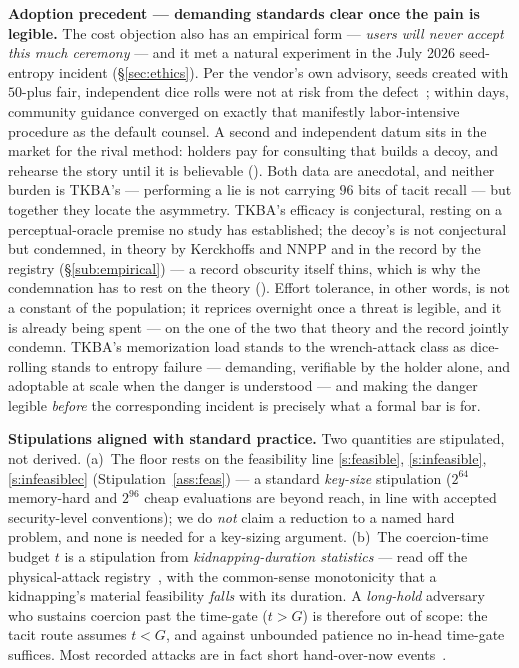 \textbf{Adoption precedent --- demanding standards clear once the pain is
legible.} The cost objection also has an empirical form --- \emph{users will
never accept this much ceremony} --- and it met a natural experiment in the
July 2026 seed-entropy incident (\S\ref{sec:ethics}). Per the vendor's own
advisory, seeds created with $50$-plus fair, independent dice rolls were not
at risk from the defect~\cite{coinkite-entropy};
within days, community guidance converged on exactly that manifestly
labor-intensive procedure as the default counsel. A second and independent datum
sits in the market for the rival method: holders pay for consulting that builds a
decoy, and rehearse the story until it is believable
(\cite[\S3]{denial-spiral}). Both data are anecdotal, and neither burden is
TKBA's --- performing a lie is not carrying $96$ bits of tacit recall --- but
together they locate the asymmetry. TKBA's efficacy is conjectural, resting on a
perceptual-oracle premise no study has established; the decoy's is not
conjectural but condemned, in theory by Kerckhoffs and NNPP and in the record by
the registry (\S\ref{sub:empirical}) --- a record obscurity itself thins, which is
why the condemnation has to rest on the theory (\cite[\S6]{denial-spiral}).
Effort tolerance, in other words, is not a
constant of the population; it reprices overnight once a threat is legible, and
it is already being spent --- on the one of the two that theory and the record
jointly condemn. TKBA's memorization load stands to the wrench-attack class
as dice-rolling stands to entropy failure --- demanding, verifiable by the
holder alone, and adoptable at scale when the danger is understood --- and
making the danger legible \emph{before} the corresponding incident is
precisely what a formal bar is for.

\textbf{Stipulations aligned with standard practice.} Two quantities are
stipulated, not derived. (a)~The floor rests on the feasibility line
\ref{s:feasible}, \ref{s:infeasible}, \ref{s:infeasiblec} (Stipulation~\ref{ass:feas}) 
--- a standard \emph{key-size} stipulation ($2^{64}$ memory-hard and $2^{96}$ cheap
evaluations are beyond reach, in line with accepted security-level conventions); we do \emph{not} claim a reduction 
to a named hard problem, and none is needed for a key-sizing argument. (b)~The coercion-time 
budget $t$ is a stipulation from \emph{kidnapping-duration statistics} --- read off the
physical-attack registry~\cite{lopp-attacks}, with the common-sense monotonicity
that a kidnapping's material feasibility \emph{falls} with its duration. A
\emph{long-hold} adversary who sustains coercion past the time-gate ($t > G$) is
therefore out of scope: the tacit route assumes $t < G$, and against unbounded patience no in-head
time-gate suffices. Most recorded attacks are in fact short hand-over-now
events~\cite[\S7]{denial-spiral}.


